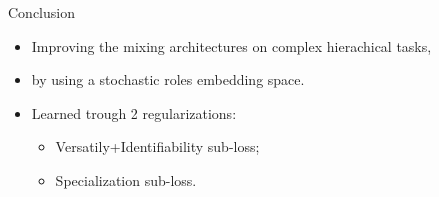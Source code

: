 \documentclass{beamer}
\begin{document}
    \begin{frame}{Conclusion}

        \begin{itemize}
            \item Improving the mixing architectures on complex hierachical tasks,
            \item by using a stochastic roles embedding space.
            \item Learned trough 2 regularizations:
            \begin{itemize}
                \item Versatily+Identifiability sub-loss;
                \item Specialization sub-loss.
            \end{itemize}

        \end{itemize}


    \end{frame}
\end{document}
